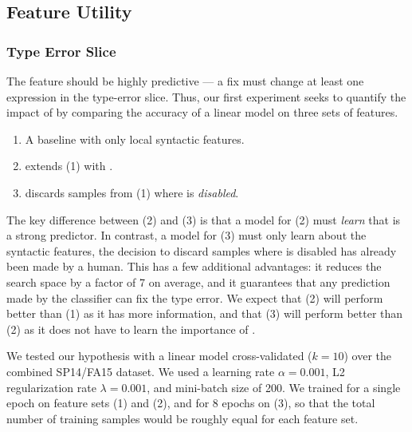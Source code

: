 \subsection{Feature Utility}
\label{sec:feature-utility}

\subsubsection{Type Error Slice}
\label{sec:type-error-slice}
The \InSlice feature should be highly predictive --- a fix must change
at least one expression in the type-error slice.
%
Thus, our first experiment seeks to quantify the impact of \InSlice by
comparing the accuracy of a linear model on three sets of features.
%
\begin{enumerate}
\item A baseline with only local syntactic features.
\item extends (1) with \InSlice.
\item discards samples from (1) where \InSlice is \emph{disabled}.
\end{enumerate}
%
The key difference between (2) and (3) is that a model for (2) must
\emph{learn} that \InSlice is a strong predictor.
%
In contrast, a model for (3) must only learn about the syntactic
features, the decision to discard samples where \InSlice is disabled has
already been made by a human.
%
This has a few additional advantages: it reduces the search space by a
factor of 7 on average, and it guarantees that any prediction made by
the classifier can fix the type error.
%
We expect that (2) will perform better than (1) as it has more
information, and that (3) will perform better than (2) as it does not
have to learn the importance of \InSlice.

We tested our hypothesis with a linear model cross-validated ($k=10$)
over the combined SP14/FA15 dataset. We used a learning rate
$\alpha=0.001$, L2 regularization rate $\lambda=0.001$, and mini-batch
size of 200. We trained for a single epoch on feature sets (1) and
(2), and for 8 epochs on (3), so that the total number of training samples
would be roughly equal for each feature set.

